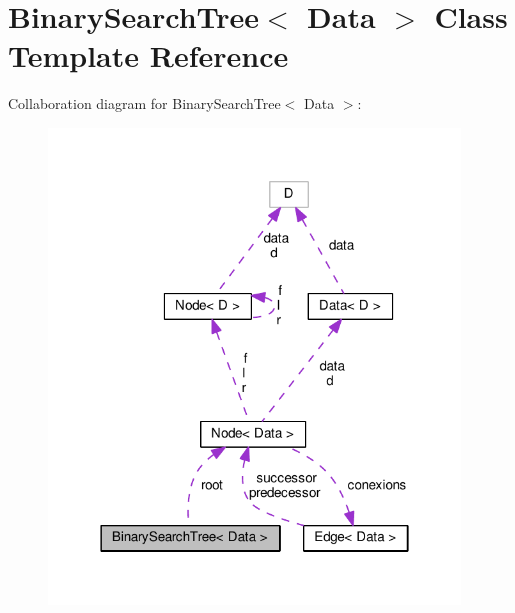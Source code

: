 \section{Binary\-Search\-Tree$<$ Data $>$ Class Template Reference}
\label{class_binary_search_tree}


Collaboration diagram for Binary\-Search\-Tree$<$ Data $>$\-:
\nopagebreak
\begin{figure}[H]
\begin{center}
\leavevmode
\includegraphics[width=310pt]{class_binary_search_tree__coll__graph}
\end{center}
\end{figure}

